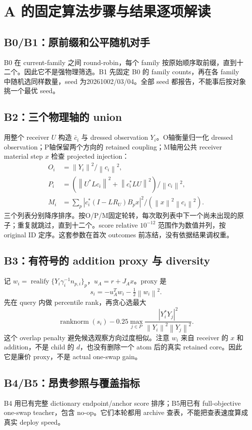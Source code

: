 \documentclass[UTF8,11pt,a4paper,fontset=fandol]{ctexart}
\newcommand{\norm}[1]{\left\lVert #1\right\rVert}
\newcommand{\op}[1]{\operatorname{#1}}
\begin{document}
\section{A 的固定算法步骤与结果逐项解读}
\subsection{B0/B1：原前缀和公平随机对手}
B0 在 current-family 之间 round-robin，每个 family 按原始顺序取前缀，直到十二个。因此它不是强物理筛选。B1 先固定 B0 的 family counts，再在各 family 中随机选同样数量，seed 为20261002/03/04。全部 seed 都报告，不能事后按对象挑一个最优 seed。

\subsection{B2：三个物理轴的 union}
用整个 receiver $U$ 构造 $\bar c_i$ 与 dressed observation $Y_i$。O轴衡量归一化 dressed observation；P轴保留两个方向的 retained coupling；M轴用公共 receiver material step $x$ 检查 projected injection：
\begin{align*}
 O_i&=\norm{Y_i}^2/\norm{c_i}^2,\\
 P_i&=(\norm{U^*Lc_i}^2+\norm{c_i^*LU}^2)/\norm{c_i}^2,\\
 M_i&=\sum_p|c_i^*(I-LR_U)B_px|^2/(\norm{x}^2\norm{c_i}^2).
\end{align*}
三个列表分别降序排序。按O/P/M固定轮转，每次取列表中下一个尚未出现的原子；重复就跳过，直到十二个。score relative $10^{-12}$ 范围作为数值并列，按 original ID 定序。这套参数在首次 outcomes 前冻结，没有依据结果调权重。

\subsection{B3：有符号的 addition proxy 与 diversity}
记 $w_i=\op{realify}\{Y_i\gamma_i^{-1}n_{p,i}\}_p$，$u_A=r+J_Ax$。proxy 是
\[
 s_i=-u_A^Tw_i-\tfrac12\norm{w_i}^2.
\]
先在 query 内做 percentile rank，再贪心选最大
\[
 \op{ranknorm}(s_i)-0.25\max_{j\in P}\frac{|Y_i^*Y_j|^2}{\norm{Y_i}^2\norm{Y_j}^2}.
\]
这个 overlap penalty 避免候选观察方向过度相似。注意 $w_i$ 来自 receiver 的 $x$ 和 addition，不是 child 的 $d$，也没有删除一个 atom 后的真实 retained core。因此它是廉价 proxy，不是 actual one-swap gain。

\subsection{B4/B5：昂贵参照与覆盖指标}
B4 用已有完整 dictionary endpoint/anchor score 排序；B5用已有 full-objective one-swap teacher，包含 no-op。它们本轮都用 archive 查表，不能把查表速度算成真实 deploy speed。
\end{document}
